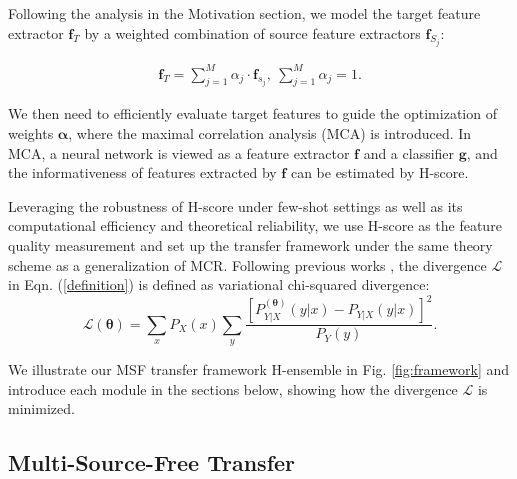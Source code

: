 \documentclass[letterpaper]{article} %
\begin{document}
Following the analysis in the Motivation section, we model the target feature extractor $\boldsymbol{f}_T$  by a weighted combination of source feature extractors $\boldsymbol{f}_{S_j}$: 

\begin{equation}
    \begin{aligned}
        \boldsymbol{f}_T = \sum_{j=1}^M \alpha_j \cdot \boldsymbol{f}_{s_j}, \ \sum_{j=1}^M \alpha_j = 1 .
    \end{aligned}
    \label{targetfeature}
\end{equation}

We then need to efficiently evaluate target features to guide the optimization of weights $\boldsymbol{\alpha}$, where the maximal correlation analysis (MCA) is introduced. In MCA, a neural network is viewed as a feature extractor $\boldsymbol{f}$ and a classifier $\boldsymbol{g}$, and the informativeness of features extracted by $\boldsymbol{f}$ can be estimated by H-score. 

Leveraging the robustness of H-score under few-shot settings as well as its computational efficiency and theoretical reliability, we use H-score as the feature quality measurement and set up the transfer framework under the same theory scheme as a generalization of MCR. Following previous works \citep{xu2020maximal}, the divergence $\mathcal L$ in Eqn. (\ref{definition}) is defined as variational chi-squared divergence: 
\begin{equation}
    \mathcal L(\boldsymbol{\theta}) = \sum_x P_X(x) \sum_y \frac{[P^{(\boldsymbol{\theta})}_{Y|X} (y|x) - P_{Y|X} (y|x)]^2}{P_Y(y)}.  
\end{equation}

We illustrate our MSF transfer framework H-ensemble in Fig. \ref{fig:framework} and introduce each module in the sections below, showing how the divergence $\mathcal L$ is minimized.

\subsection{Multi-Source-Free Transfer}


\end{document}
